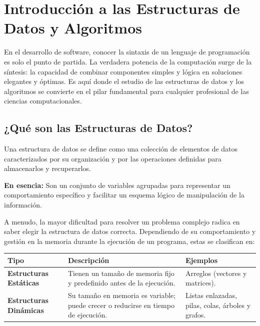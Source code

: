 \documentclass[
  spanish,
  letterpaper,
  DIV=11,
  numbers=noendperiod]{scrreprt}
\newcounter{none} %
\begin{document}
\section{Introducción a las Estructuras de Datos y
Algoritmos}\label{introducciuxf3n-a-las-estructuras-de-datos-y-algoritmos}

En el desarrollo de software, conocer la sintaxis de un lenguaje de
programación es solo el punto de partida. La verdadera potencia de la
computación surge de la síntesis: la capacidad de combinar componentes
simples y lógica en soluciones elegantes y óptimas. Es aquí donde el
estudio de las estructuras de datos y los algoritmos se convierte en el
pilar fundamental para cualquier profesional de las ciencias
computacionales.

\subsection{¿Qué son las Estructuras de
Datos?}\label{quuxe9-son-las-estructuras-de-datos}

Una estructura de datos se define como una colección de elementos de
datos caracterizados por su organización y por las operaciones definidas
para almacenarlos y recuperarlos.

\textbf{En esencia:} Son un conjunto de variables agrupadas para
representar un comportamiento específico y facilitar un esquema lógico
de manipulación de la información.

A menudo, la mayor dificultad para resolver un problema complejo radica
en saber elegir la estructura de datos correcta. Dependiendo de su
comportamiento y gestión en la memoria durante la ejecución de un
programa, estas se clasifican en:

{\def\LTcaptype{none} %
\begin{longtable}[]{@{}
  >{\raggedright\arraybackslash}p{}
  >{\raggedright\arraybackslash}p{}
  >{\raggedright\arraybackslash}p{}@{}}
\toprule\noalign{}
\begin{minipage}[b]{\linewidth}\raggedright
Tipo
\end{minipage} & \begin{minipage}[b]{\linewidth}\raggedright
Descripción
\end{minipage} & \begin{minipage}[b]{\linewidth}\raggedright
Ejemplos
\end{minipage} \\
\midrule\noalign{}
\endhead
\bottomrule\noalign{}
\endlastfoot
\textbf{Estructuras Estáticas} & Tienen un tamaño de memoria fijo y
predefinido antes de la ejecución. & Arreglos (vectores y matrices). \\
\textbf{Estructuras Dinámicas} & Su tamaño en memoria es variable; puede
crecer o reducirse en tiempo de ejecución. & Listas enlazadas, pilas,
colas, árboles y grafos. \\
\end{longtable}
}
\end{document}
